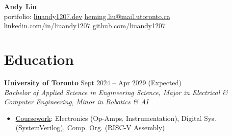 \documentclass[10pt,letterpaper]{article}
\begin{document}
\begin{center}
\huge{\textbf{Andy Liu}} \\
\vspace{0.25em}
\small{{portfolio: 
    \href{https://liuandy1207.dev}{liuandy1207.dev}}
    \hspace{0.5em} \textbar\hspace{0.5em}
    \href{mailto: heming.liu@mail.utoronto.ca}{heming.liu@mail.utoronto.ca}
    \hspace{0.5em} \textbar\hspace{0.5em}
    \href{https://www.linkedin.com/in/liuandy1207/}{linkedin.com/in/liuandy1207}}
    \hspace{0.5em} \textbar\hspace{0.5em}
    \href{https://github.com/liuandy1207}{github.com/liuandy1207}
\end{center} \vspace{-0.7em}







\section{Education}

\textbf{University of Toronto} \hfill
Sept 2024 -- Apr 2029 (Expected) \\
\textit{Bachelor of Applied Science in Engineering Science, Major in Electrical \& Computer Engineering, Minor in Robotics \& AI} \hfill 
\begin{itemize}
    \item \underline{Coursework}: 
    Electronics (Op-Amps, Instrumentation), 
    Digital Sys. (SystemVerilog), Comp. Org. (RISC-V Assembly)
\end{itemize} \vspace{0.5em}

\end{document}
